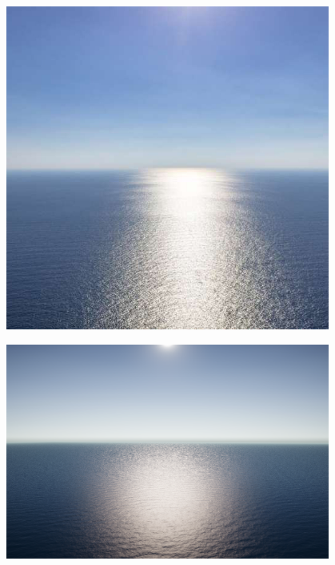 \begin{minipage}{0.48\textwidth}
    \centering
    \includegraphics[width=0.8\textwidth]{"images/real_calm_ocean.jpg"}
    \captionsetup{justification=centering}
    \label{fig:real_calm_ocean}
\end{minipage}
\hfill
\begin{minipage}{0.48\textwidth}
    \centering
    \includegraphics[width=0.8\textwidth]{"images/fake_calm_ocean.png"}
    \label{fig:fake_calm_ocean}
\end{minipage}

